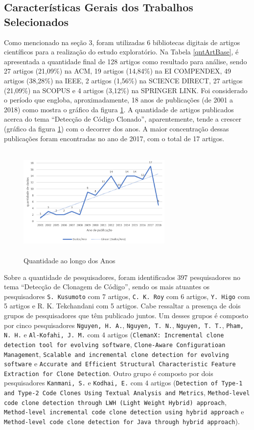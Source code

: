 \subsection{Características Gerais dos Trabalhos Selecionados}
Como mencionado na seção 3, foram utilizadas 6 bibliotecas digitais de artigos científicos para a realização do estudo exploratório. Na Tabela \ref{qntArtBase}, é apresentada a quantidade final de 128 artigos como resultado para análise, sendo 27 artigos (21,09\%) na ACM, 19 artigos (14,84\%) na EI COMPENDEX, 49 artigos (38,28\%) na IEEE, 2 artigos (1,56\%) na SCIENCE DIRECT, 27 artigos (21,09\%) na SCOPUS e 4 artigos (3,12\%) na SPRINGER LINK. Foi considerado o período que engloba, aproximadamente, 18 anos de publicações (de 2001 a 2018) como mostra o gráfico da figura \ref{gAno}. A quantidade de artigos publicados acerca do tema ``Detecção de Código Clonado'', aparentemente, tende a crescer (gráfico da figura \ref{gAno}) com o decorrer dos anos. A maior concentração dessas publicações foram encontradas no ano de 2017, com o total de 17 artigos.

\begin{figure}[!htb]
	\centering
	\includegraphics[height=2.2in, width=3in]{graficoAno.PNG}
	\caption{Quantidade ao longo dos Anos} 
	\label{gAno}
\end{figure}

Sobre a quantidade de pesquisadores, foram identificados 397 pesquisadores no tema ``Detecção de Clonagem de Código'', sendo os mais atuantes os pesquisadores \texttt{S. Kusumoto} com 7 artigos, \texttt{C. K. Roy} com 6 artigos, \texttt{Y. Higo} com 5 artigos e R. K. Tekchandani com 5 artigos. Cabe ressaltar a presença de dois grupos de pesquisadores que têm publicado juntos. Um desses grupos é composto por cinco pesquisadores \texttt{Nguyen, H. A.}, \texttt{Nguyen, T. N.}, \texttt{Nguyen, T. T.}, \texttt{Pham, N. H.} e \texttt{Al-Kofahi, J. M.} com 4 artigos (\texttt{ClemanX: Incremental clone detection tool for evolving software}, \texttt{Clone-Aware Configuratioan Management}, \texttt{Scalable and incremental clone detection for evolving software} e \texttt{Accurate and Efficient Structural Characteristic Feature Extraction for Clone Detection}. Outro grupo é composto por dois pesquisadores \texttt{Kanmani, S.} e \texttt{Kodhai, E.} com 4 artigos (\texttt{Detection of Type-1 and Type-2 Code Clones Using Textual Analysis and Metrics}, \texttt{Method-level code clone detection through LWH (Light Weight Hybrid) approach}, \texttt{Method-level incremental code clone detection using hybrid approach} e \texttt{Method-level code clone detection for Java through hybrid approach}).

